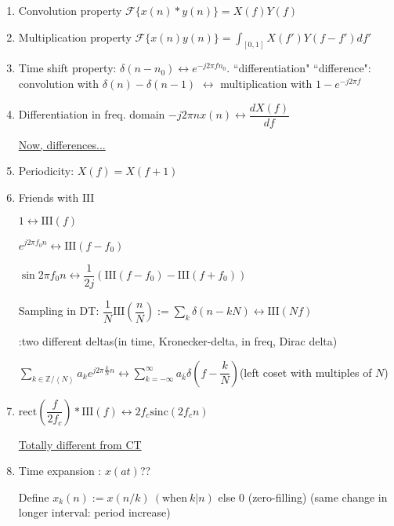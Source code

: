 \documentclass{article}
\begin{document}
\begin{enumerate}
        \item Convolution property $\mathcal{F}\{x(n)*y(n)\}=X(f)Y(f)$
        
        \item Multiplication property $\mathcal{F}\{x(n)y(n)\}=\displaystyle\int_{[0,1]}X(f')Y(f-f')df'$
        
        \item Time shift property: $\delta(n-n_0)\leftrightarrow e^{-j2\pi fn_0}$. ``differentiation" ``difference": convolution with $\delta(n)-\delta(n-1)$ $\leftrightarrow$ multiplication with $1-e^{-j2\pi f}$
        
        \item Differentiation in freq. domain $-j2\pi n x(n) \leftrightarrow \dfrac{dX(f)}{df}$
        
        \underline{Now, differences...}
        
        \item Periodicity: $X(f)=X(f+1)$
        \item Friends with $\mathrm{III}$
        
        $1\leftrightarrow\mathrm{III}(f)$
        
        $e^{j2\pi f_0 n}\leftrightarrow\mathrm{III}(f-f_0)$
        
        $\sin{2\pi f_0 n}\leftrightarrow \dfrac{1}{2j}(\mathrm{III}(f-f_0)-\mathrm{III}(f+f_0))$
        
        Sampling in DT: $\dfrac{1}{N}\mathrm{III}\left(\dfrac{n}{N}\right):=\sum_k\delta(n-kN)\leftrightarrow\mathrm{III}(Nf)$
        
        :two different deltas(in time, Kronecker-delta, in freq, Dirac delta)
        
        $\displaystyle\sum_{k\in\mathbb{Z}/\left<N\right>}a_k e^{j2\pi\frac{k}{N}n}\leftrightarrow\displaystyle\sum_{k=-\infty}^{\infty}{a_{\overline{k}}\delta\left(f-\dfrac{k}{N}\right)}$(left coset with multiples of $N$)
        
        \item$\mathrm{rect}\left(\dfrac{f}{2f_c}\right)*\mathrm{III}(f)\leftrightarrow 2f_c\mathrm{sinc}(2f_c n)$
        
        \underline{Totally different from CT}
        
        \item Time expansion : $x(at)$??
        
        Define $x_k(n):=x(n/k)\:(\mathrm{when}\:k|n)$ else 0 (zero-filling) (same change in longer interval: period increase)
        

\end{enumerate}
\end{document}
